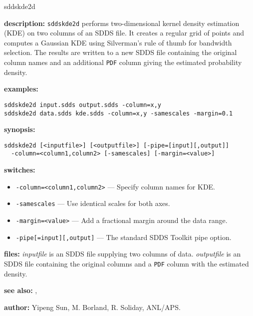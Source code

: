 \begin{sddsprog}{sddskde2d}
  \item \textbf{description:} \verb|sddskde2d| performs two-dimensional kernel density estimation (KDE) on two columns of an SDDS file. It creates a regular grid of points and computes a Gaussian KDE using Silverman's rule of thumb for bandwidth selection. The results are written to a new SDDS file containing the original column names and an additional \verb|PDF| column giving the estimated probability density.

  \item \textbf{examples:}
    \begin{verbatim}
sddskde2d input.sdds output.sdds -column=x,y
sddskde2d data.sdds kde.sdds -column=x,y -samescales -margin=0.1
    \end{verbatim}

  \item \textbf{synopsis:}
    \begin{verbatim}
sddskde2d [<inputfile>] [<outputfile>] [-pipe=[input][,output]]
  -column=<column1,column2> [-samescales] [-margin=<value>]
    \end{verbatim}

  \item \textbf{switches:}
    \begin{itemize}
      \item \verb|-column=<column1,column2>| --- Specify column names for KDE.
      \item \verb|-samescales| --- Use identical scales for both axes.
      \item \verb|-margin=<value>| --- Add a fractional margin around the data range.
      \item \verb|-pipe[=input][,output]| --- The standard SDDS Toolkit pipe option.
    \end{itemize}

  \item \textbf{files:} \emph{inputfile} is an SDDS file supplying two columns of data. \emph{outputfile} is an SDDS file containing the original columns and a \verb|PDF| column with the estimated density.

  \item \textbf{see also:} , 

  \item \textbf{author:} Yipeng Sun, M. Borland, R. Soliday, ANL/APS.
\end{sddsprog}

